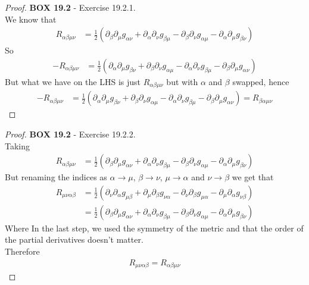 \documentclass[11pt]{article}
\theoremstyle{definition}
\begin{document}
\cleardoublepage
\begin{proof}{\textbf{BOX 19.2} - Exercise 19.2.1.}\\
We know that
\begin{align*}
    R_{\alpha\beta\mu\nu} &= \frac{1}{2}(
    \partial_{\beta}\partial_{\mu}g_{\alpha\nu}
    + \partial_{\alpha}\partial_{\nu}g_{\beta\mu}
    - \partial_{\beta}\partial_{\nu}g_{\alpha\mu}
    - \partial_{\alpha}\partial_{\mu}g_{\beta\nu})
\end{align*}
So 
\begin{align*}
    -R_{\alpha\beta\mu\nu} &= \frac{1}{2}(
    \partial_{\alpha}\partial_{\mu}g_{\beta\nu}
    + \partial_{\beta}\partial_{\nu}g_{\alpha\mu}
    - \partial_{\alpha}\partial_{\nu}g_{\beta\mu}
    - \partial_{\beta}\partial_{\mu}g_{\alpha\nu}
    )
\end{align*}
But what we have on the LHS is just $R_{\alpha\beta\mu\nu}$ but with $\alpha$
and $\beta$ swapped, hence
\begin{align*}
    -R_{\alpha\beta\mu\nu} &= \frac{1}{2}(
    \partial_{\alpha}\partial_{\mu}g_{\beta\nu}
    + \partial_{\beta}\partial_{\nu}g_{\alpha\mu}
    - \partial_{\alpha}\partial_{\nu}g_{\beta\mu}
    - \partial_{\beta}\partial_{\mu}g_{\alpha\nu}
    ) = R_{\beta\alpha\mu\nu}
\end{align*}
\end{proof}
\begin{proof}{\textbf{BOX 19.2} - Exercise 19.2.2.}\\
Taking
\begin{align*}
    R_{\alpha\beta\mu\nu} &= \frac{1}{2}(
    \partial_{\beta}\partial_{\mu}g_{\alpha\nu}
    + \partial_{\alpha}\partial_{\nu}g_{\beta\mu}
    - \partial_{\beta}\partial_{\nu}g_{\alpha\mu}
    - \partial_{\alpha}\partial_{\mu}g_{\beta\nu})
\end{align*}
But renaming the indices as $\alpha\to \mu$, $\beta\to \nu$, $\mu\to \alpha$
and $\nu\to \beta$ we get that
\begin{align*}
    R_{\mu\nu\alpha\beta} 
    &= \frac{1}{2}(
    \partial_{\nu}\partial_{\alpha}g_{\mu\beta}
    + \partial_{\mu}\partial_{\beta}g_{\nu\alpha}
    - \partial_{\nu}\partial_{\beta}g_{\mu\alpha}
    - \partial_{\mu}\partial_{\alpha}g_{\nu\beta})\\
    &= \frac{1}{2}(
    \partial_{\beta}\partial_{\mu}g_{\alpha\nu}
    + \partial_{\alpha}\partial_{\nu}g_{\beta\mu}
    - \partial_{\beta}\partial_{\nu}g_{\alpha\mu}
    - \partial_{\alpha}\partial_{\mu}g_{\beta\nu})
\end{align*}
Where In the last step, we used the symmetry of the metric and that the order
of the partial derivatives doesn't matter.
\\
Therefore
\begin{align*}
    R_{\mu\nu\alpha\beta} = R_{\alpha\beta\mu\nu}
\end{align*}
\end{proof}
\end{document}
